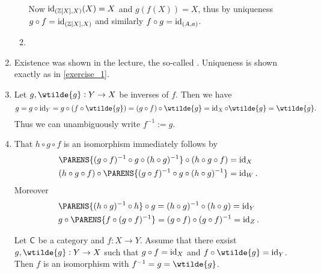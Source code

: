 \begin{enumerate}[label = \textbf{Exercise \arabic*.},wide = 0pt, itemsep=1.5ex]
\begin{enumerate}[label = \textup{(}\alph*\textup{)}]
\begin{figure}[h!tb]
				\end{figure}\\
				Now $\id_{(\Zbb\sbr[0]{X},X)}(X) = X$ and $g(f(X)) = X$, thus by uniqueness $g \circ f = \id_{(\Zbb\sbr[0]{X},X)}$ and similarly $f \circ g = \operatorname{id}_{(A,a)}$.
			\item
		\end{enumerate}
	\item Existence was shown in the lecture, the so-called . Uniqueness is shown exactly as in \ref{exercise_1}.
	\item Let $g,\wtilde{g} : Y \to X$ be inverses of $f$. Then we have
		\begin{equation*}
			g = g \circ \id_Y = g \circ (f \circ \wtilde{g}) = (g \circ f) \circ \wtilde{g} = \id_X \circ \wtilde{g} = \wtilde{g}.
		\end{equation*}
		Thus we can unambiguously write $f^{-1} := g$.
	\item That $h \circ g \circ f$ is an isomorphism immediately follows by
		\begin{align*}
			& \PARENS{(g \circ f)^{-1} \circ g \circ (h \circ g)^{-1}} \circ (h \circ g \circ f) = \id_X\\
			& (h \circ g \circ f) \circ \PARENS{(g \circ f)^{-1} \circ g \circ (h \circ g)^{-1}} = \id_W.
		\end{align*}
		Moreover
		\begin{align*}
			&\PARENS{(h \circ g)^{-1} \circ h} \circ g = (h \circ g)^{-1} \circ (h \circ g) = \id_Y\\
			&g \circ \PARENS{f \circ (g \circ f)^{-1}} = (g \circ f) \circ (g \circ f)^{-1} = \id_Z.
		\end{align*}
		\begin{lemma}
			Let $\mathsf{C}$ be a category and $f : X \to Y$. Assume that there exsist $g,\wtilde{g}: Y \to X$ such that $g \circ f = \operatorname{id}_X$ and $f \circ \wtilde{g} = \id_Y$. Then $f$ is an isomorphism with $f^{-1} = g = \wtilde{g}$.
		\end{lemma}


\end{enumerate}

